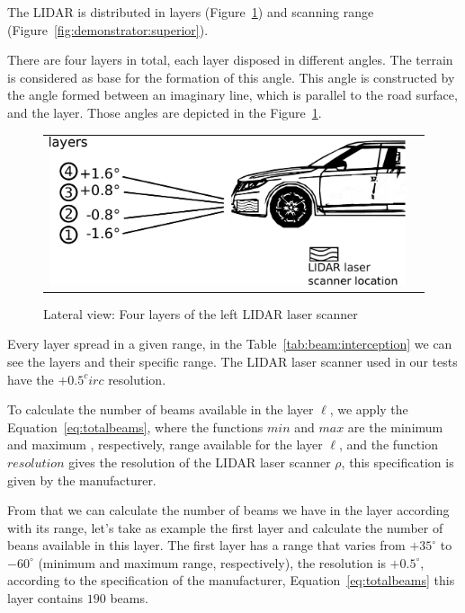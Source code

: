 The LIDAR is distributed in layers (Figure~\ref{fig:demonstrator:lateral}) and scanning range (Figure~\ref{fig:demonstrator:superior}). 

There are four layers in total, each layer disposed in different angles. The terrain is considered as base for the formation of this angle. This angle is constructed by the angle formed between an imaginary line, which is parallel to the road surface, and the layer. Those angles are depicted in the Figure~\ref{fig:demonstrator:lateral}.

\begin{figure}[h]
   \centering
     \begin{tabular}{lr}
       \includegraphics[scale=0.5]{img/fig:demonstrator:lateral}
     \end{tabular}
   \caption{Lateral view: Four layers of the left LIDAR laser scanner}
   \label{fig:demonstrator:lateral}
\end{figure}

Every layer spread in a given range, in the Table~\ref{tab:beam:interception} we can see the layers and their specific range. The LIDAR laser scanner used in our tests have the $+0.5^circ$ resolution. 

To calculate the number of beams available in the layer $\ell$, we apply the Equation~\ref{eq:totalbeams}, where the functions $min$ and $max$ are the minimum and maximum  , respectively, range available for the layer $\ell$, and the function $resolution$ gives the resolution of the LIDAR laser scanner $\rho$, this specification is given by the manufacturer. 

From that we can calculate the number of beams we have in the layer according with its range, let's take as example the first layer and calculate the number of beans available in this layer. The first layer has a range that varies from $+35^\circ$ to $-60^\circ$ (minimum and maximum range, respectively), the resolution is $+0.5^\circ$, according to the specification of the manufacturer, Equation~\ref{eq:totalbeams} this layer contains $190$ beams.

